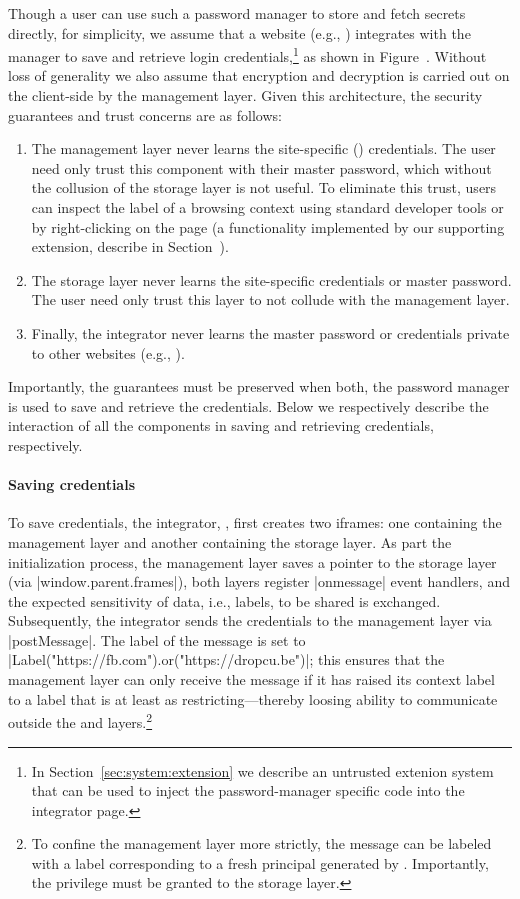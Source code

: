 %
Though a user can use such a password manager to store and fetch
secrets directly, for simplicity, we assume that a website (e.g.,
) integrates with the manager to save and retrieve login
credentials,\footnote{
  In Section~\ref{sec:system:extension} we describe an untrusted
  extenion system that can be used to inject the password-manager
  specific code into the integrator page.
} as shown in Figure~.
%
Without loss of generality we also assume that encryption and
decryption is carried out on the client-side by the management layer.
%
Given this architecture, the security guarantees and trust concerns
are as follows:
\begin{enumerate}
\item The management layer never learns the site-specific
  () credentials. The user need only trust this
  component with their master password, which without the collusion of
  the storage layer is not useful.
  To eliminate this trust, users can inspect the label of a browsing
  context using standard developer tools or by right-clicking on the
  page (a functionality implemented by our supporting extension,
  describe in Section~).
\item The storage layer never learns the site-specific credentials or
  master password. The user need only trust this layer to not collude
  with the management layer.
\item Finally, the integrator never learns the master password or
  credentials private to other websites (e.g., ).
\end{enumerate}
%
Importantly, the guarantees must be preserved when both, the
password manager is used to save and retrieve the credentials.
%
Below we respectively describe the interaction of all the components
in saving and retrieving credentials, respectively.

\paragraph{Saving credentials}
%
To save credentials, the integrator, , first creates two
iframes: one containing the  management layer and
another containing the  storage layer.
%
As part the initialization process, the management layer saves a
pointer to the storage layer (via \js|window.parent.frames|), both
layers register \js|onmessage| event handlers, and the expected
sensitivity of data, i.e., labels, to be shared is exchanged.
%
Subsequently, the integrator sends the credentials to the management
layer via \js|postMessage|.
%
The label of the message is set to
\js|Label("https://fb.com").or("https://dropcu.be")|; this ensures
that the management layer can only receive the message if it has
raised its context label to a label that is at least as
restricting---thereby loosing ability to communicate outside the
 and  layers.\footnote{
  To confine the management layer more strictly, the message can be
  labeled with a label corresponding to a fresh principal generated by
  . Importantly, the privilege must be granted to the
  storage layer.
}
 
